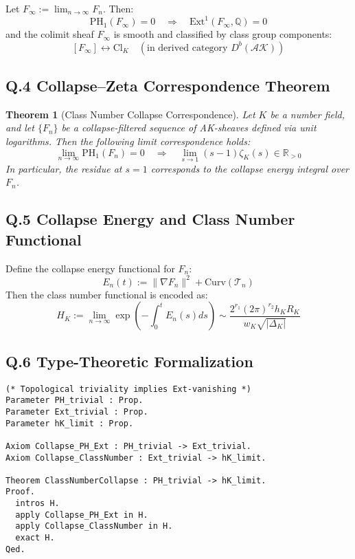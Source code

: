 \documentclass[11pt]{article}
\newtheorem{theorem}{Theorem}[section]
\begin{document}
\begin{axiom}
\begin{axiom}
{{Let $F_\infty := \lim_{n \to \infty} F_n$. Then:
\[
\mathrm{PH}_1(F_\infty) = 0 \quad \Rightarrow \quad \mathrm{Ext}^1(F_\infty, \mathbb{Q}) = 0
\]
and the colimit sheaf $F_\infty$ is smooth and classified by class group components:
\[
[F_\infty] \leftrightarrow \text{Cl}_K \quad (\text{in derived category } D^b(\mathcal{AK}))
\]

\subsection*{Q.4 Collapse–Zeta Correspondence Theorem}

\begin{theorem}[Class Number Collapse Correspondence]
Let $K$ be a number field, and let $\{F_n\}$ be a collapse-filtered sequence of AK-sheaves defined via unit logarithms.  
Then the following limit correspondence holds:
\[
\lim_{n \to \infty} \mathrm{PH}_1(F_n) = 0 \quad \Longrightarrow \quad \lim_{s \to 1} (s - 1)\zeta_K(s) \in \mathbb{R}_{>0}
\]
\textit{In particular, the residue at $s = 1$ corresponds to the collapse energy integral over $F_n$.}
\end{theorem}

\subsection*{Q.5 Collapse Energy and Class Number Functional}

Define the collapse energy functional for $F_n$:
\[
E_n(t) := \| \nabla F_n \|^2 + \mathrm{Curv}(\mathcal{T}_n)
\]
Then the class number functional is encoded as:
\[
H_K := \lim_{n \to \infty} \exp\left( -\int_0^t E_n(s)ds \right) \sim \frac{2^{r_1} (2\pi)^{r_2} h_K R_K}{w_K \sqrt{|\Delta_K|}}
\]

\subsection*{Q.6 Type-Theoretic Formalization}

\begin{verbatim}
(* Topological triviality implies Ext-vanishing *)
Parameter PH_trivial : Prop.
Parameter Ext_trivial : Prop.
Parameter hK_limit : Prop.

Axiom Collapse_PH_Ext : PH_trivial -> Ext_trivial.
Axiom Collapse_ClassNumber : Ext_trivial -> hK_limit.

Theorem ClassNumberCollapse : PH_trivial -> hK_limit.
Proof.
  intros H.
  apply Collapse_PH_Ext in H.
  apply Collapse_ClassNumber in H.
  exact H.
Qed.
\end{verbatim}

}}
\end{axiom}
\end{axiom}
\end{document}
